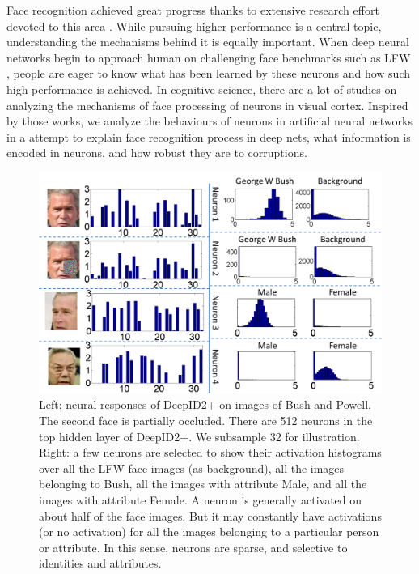 \documentclass[10pt,twocolumn,letterpaper]{article}
\begin{document}
Face recognition  achieved great progress thanks to extensive research effort devoted to this area \cite{wright2009,taigman2009,kumar2009,huang2011,berg2012,chen2012,huang2012,simonyan2013,chen2013,cao2013,sun2013b,taigman2014a,sun2014a,taigman2014b,sun2014b}. While pursuing higher performance is a central topic, understanding the mechanisms behind it is equally important. When deep neural networks begin to approach  human on challenging face benchmarks \cite{taigman2014a,sun2014a,taigman2014b,sun2014b} such as LFW \cite{huang2007a}, people are eager to know what has been learned by these neurons and how such high performance is achieved. In cognitive science, there are a lot of studies  \cite{tsao2008} on analyzing the mechanisms of face processing of neurons in  visual cortex. Inspired by those works,  we analyze the behaviours of neurons in artificial neural networks in a attempt to explain  face recognition process in deep nets, what information is encoded in  neurons, and how robust they are to  corruptions.

\begin{figure}[t]
\begin{center}
\includegraphics[width=1.0\linewidth]{picture/03.png}
\end{center}
\vspace{-0.15in}
\caption{Left: neural responses of DeepID2+ on images of Bush and Powell.  The second face is partially occluded. There are 512 neurons in the top hidden layer of DeepID2+. We subsample 32 for illustration. Right: a few neurons are selected to show their activation histograms over all the LFW face images (as background), all the images belonging to Bush, all the images with attribute Male, and all the images with attribute Female. A neuron is generally activated on about half of the face images. But it may constantly have activations (or no activation) for all the images belonging to a particular person or attribute.  In this sense, neurons are sparse, and selective to identities and attributes. }
\label{fig:demo}
\vspace{-0.1in}
\end{figure}
\end{document}
